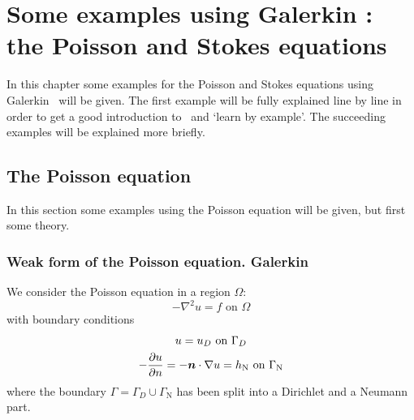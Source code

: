
\chapter{Some examples using Galerkin \fem: the Poisson and Stokes equations}

\label{ch:examples}

\def\chaptertitle{Some examples}
\def\headdate{4th December 2025}

In this chapter some examples for the Poisson and Stokes equations using
Galerkin \fem\ will be given.
The first example will be fully
explained line by line in order to get a good introduction to \tfem\
and `learn by example'. The succeeding examples
will be explained more briefly.

\section{The Poisson equation}

In this section some examples using the Poisson equation will be given, but
first some theory.

\subsection{Weak form of the Poisson equation. Galerkin \fem}
\label{sec:poissonweak}

We consider the Poisson equation in a region $\Omega$:
\begin{equation}
     -\nabla^2 u = f\text{ on }\Omega
   \label{eq:poisson}
\end{equation}
with boundary conditions
\begin{gather}
    u = u_D\text{ on }\Gamma_D\\
    -\dfrac{\partial u}{\partial n}=-\boldsymbol{n}\cdot\nabla u=h_{\text{N}}\text{ on
}\Gamma_{\text{N}}
\end{gather}
where the boundary $\Gamma=\Gamma_D\cup\Gamma_{\text{N}}$ has been split into a
Dirichlet and a Neumann part.

